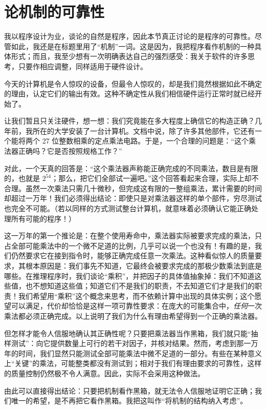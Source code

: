 \section[论机制的可靠性]{论机制的可靠性}
\label{sec:realiability-of-mechanisms}

我以程序设计为业，谈论的自然是程序，因此本节真正讨论的是程序的可靠性。尽管如此，我还是在标题里用了“机制”一词。这是因为，我把程序看作机制的一种具体形式；而且，我至少想有一次明确表达自己的强烈感受：我关于软件的许多思考，只要作相应调整，同样适用于硬件设计。

今天的计算机是令人惊叹的设备，但最令人惊叹的，却是我们竟然根据如此不确定的理由，认定它们的输出有效。这种不确定性从我们相信硬件运行正常时就已经开始了。

让我们暂且只关注硬件，想一想：我们究竟能在多大程度上确信它的构造正确？几年前，我所在的大学安装了一台计算机。文档中说，除了许多其他部件，它还有一个能将两个 27 位整数相乘的定点乘法电路。于是，一个合理的问题是：“这个乘法器正确吗？它是否按照规格工作？”

对此，一个天真的回答是：“这个乘法器声称能正确完成的不同乘法，数目是有限的，也就是 $2^{54}$；那么，把它们全部试一遍吧。”这个回答看起来合理，实际上却不合理。虽然一次乘法只需几十微秒，但完成这有限的一整组乘法，累计需要的时间却超过一万年！我们必须得出结论：即使只是对乘法器这样的单个部件，穷尽测试也完全不可能。（若以同样的方式测试整台计算机，就意味着必须确认它能正确处理所有可能的程序！）

这一万年的第一个推论是：在整个使用寿命中，乘法器实际被要求完成的乘法，只占全部可能乘法中的一个微不足道的比例，几乎可以说一个也没有！有趣的是，我们仍然要求它在接到指令时，能够正确完成任意一次乘法。这种看似惊人的质量要求，其根本原因是：我们事先不知道，它最终会被要求完成的那极少数乘法到底是哪些。在推理程序时，我们谈论“乘积”，并把因子的具体值抽象掉：我们不知道这些值，也不想知道这些值；知道它们不是我们的职责，不去知道它们才是我们的职责！我们希望用“乘积”这个概念来思考，而不依赖计算中出现的具体实例；这个愿望可以满足，代价却恰恰是这样一项可靠性要求：在庞大的可能集合中，\textit{任何}一次乘法都必须正确完成。以上说明了我们为什么有理由希望得到一个正确的乘法器。

但怎样才能令人信服地确认其正确性呢？只要把乘法器当作黑箱，我们就只能“抽样测试”：向它提供数量上可行的若干对因子，并核对结果。然而，考虑到那一万年的时间，我们显然只能测试全部可能乘法中微不足道的一部分。有些在某种意义上“关键”的乘法，可能整类都没有测试到；相对于我们有理由要求的可靠性，这样的质量控制仍然极不令人满意。因此，实际不会采用这种做法。

由此可以直接得出结论：只要把机制看作黑箱，就无法令人信服地证明它正确；我们唯一的希望，是不再把它看作黑箱。我把这叫作“将机制的结构纳入考虑”。

